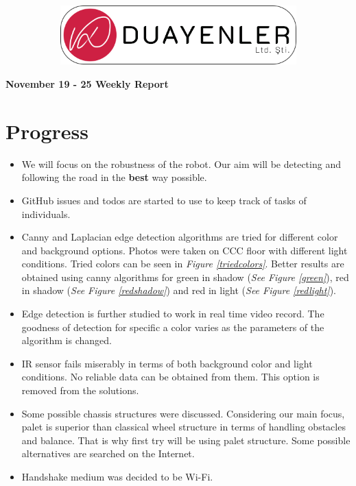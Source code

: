 \documentclass[a4paper,12pt]{article}
\begin{document}
	
\begin{figure}
	\vspace*{-.7cm}
	\centering
	\begin{figure}[H]
		\centering
		\setlength{\unitlength}{\textwidth} 
		\includegraphics[width=0.9\unitlength]{../../../Documents/logos/logo3-with-stroke}
	\end{figure}
\end{figure}
\vspace*{-1.7cm}
\begin{center}
	\Large\textbf{November 19 - 25 Weekly Report}
	\end{center}



\section{Progress}
\begin{itemize}
	\item We will focus on the robustness of the robot. Our aim will be detecting and following the road in the \textbf{best} way possible.
	\item GitHub issues and todos are started to use to keep track of tasks of individuals.
	\item Canny and Laplacian edge detection algorithms are tried for different color and background options. Photos were taken on CCC floor with different light conditions. Tried colors can be seen in \textit{Figure \ref{triedcolors}}. Better results are obtained using canny algorithms for green in shadow (\textit{See Figure \ref{green}}), red in shadow (\textit{See Figure \ref{redshadow}}) and red in light (\textit{See Figure \ref{redlight}}).
	
	\item Edge detection is further studied to work in real time video record. The goodness of detection for specific a color varies as the parameters of the algorithm is changed.  
	
	\item IR sensor fails miserably in terms of both background color and light conditions. No reliable data can be obtained from them. This option is removed from the solutions.
	
	\item Some possible chassis structures were discussed. Considering our main focus, palet is superior than classical wheel structure in terms of handling obstacles and balance. That is why first try will be using palet structure. Some possible alternatives are searched on the Internet.
	
	\item Handshake medium was decided to be Wi-Fi. 
\end{itemize}
\end{document}

